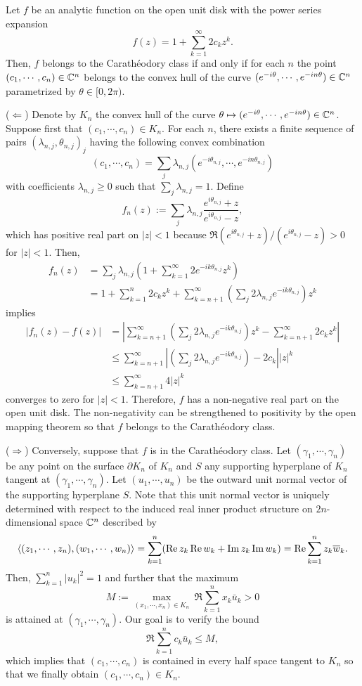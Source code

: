 \documentclass[a4paper]{article}
\begin{document}
\begin{thm}
Let $f$ be an analytic function on the open unit disk with the power series expansion
\[f(z)=1+\sum_{k=1}^\infty2c_kz^k.\]
Then, $f$ belongs to the Carath\'eodory class if and only if for each $n$ the point $(c_1,\cdots,c_n)\in\mathbb{C}^n$ belongs to the convex hull of the curve $(e^{-i\theta},\cdots,e^{-in\theta})\in\mathbb{C}^n$ parametrized by $\theta\in[0,2\pi)$.
\end{thm}
\begin{pf}
($\Leftarrow$)
Denote by $K_n$ the convex hull of the curve $\theta\mapsto(e^{-i\theta},\cdots,e^{-in\theta})\in\mathbb{C}^n$.
Suppose first that $(c_1,\cdots,c_n)\in K_n$.
For each $n$, there exists a finite sequence of pairs $(\lambda_{n,j},\theta_{n,j})_j$ having the following convex combination
\[(c_1,\cdots,c_n)=\sum_j\lambda_{n,j}(e^{-i\theta_{n,j}},\cdots,e^{-in\theta_{n,j}})\]
with coefficients $\lambda_{n,j}\ge0$ such that $\sum_j\lambda_{n,j}=1$.
Define
\[f_n(z):=\sum_j\lambda_{n,j}\frac{e^{i\theta_{n,j}}+z}{e^{i\theta_{n,j}}-z},\]
which has positive real part on $|z|<1$ because $\Re(e^{i\theta_{n,j}}+z)/(e^{i\theta_{n,j}}-z)>0$ for $|z|<1$.
Then,
\begin{align*}
f_n(z)
&=\sum_j\lambda_{n,j}(1+\sum_{k=1}^\infty2e^{-ik\theta_{n,j}}z^k)\\
&=1+\sum_{k=1}^n2c_kz^k+\sum_{k=n+1}^\infty\left(\sum_j2\lambda_{n,j}e^{-ik\theta_{n,j}}\right)z^k
\end{align*}
implies
\begin{align*}
|f_n(z)-f(z)|
&=\left|\sum_{k=n+1}^\infty\left(\sum_j2\lambda_{n,j}e^{-ik\theta_{n,j}}\right)z^k-\sum_{k=n+1}^\infty2c_kz^k\right|\\
&\le\sum_{k=n+1}^\infty\left|\left(\sum_j2\lambda_{n,j}e^{-ik\theta_{n,j}}\right)-2c_k\right||z|^k\\
&\le\sum_{k=n+1}^\infty4|z|^k
\end{align*}
converges to zero for $|z|<1$.
Therefore, $f$ has a non-negative real part on the open unit disk.
The non-negativity can be strengthened to positivity by the open mapping theorem so that $f$ belongs to the Carath\'eodory class.

($\Rightarrow$)
Conversely, suppose that $f$ is in the Carath\'eodory class.
Let $(\gamma_1,\cdots,\gamma_n)$ be any point on the surface $\partial K_n$ of $K_n$ and $S$ any supporting hyperplane of $K_n$ tangent at $(\gamma_1,\cdots,\gamma_n)$.
Let $(u_1,\cdots,u_n)$ be the outward unit normal vector of the supporting hyperplane $S$.
Note that this unit normal vector is uniquely determined with respect to the induced real inner product structure on $2n$-dimensional space $\mathbb{C}^n$ described by
\[\langle(z_1,\cdots,z_n),(w_1,\cdots,w_n)\rangle=\sum_{k=1}^n(\operatorname{Re} z_k\operatorname{Re} w_k+\operatorname{Im} z_k\operatorname{Im} w_k)=\operatorname{Re}\sum_{k=1}^nz_k\overline w_k.\]
Then, $\sum_{k=1}^n|u_k|^2=1$ and further that the maximum
\[M:=\max_{(x_1,\cdots,x_n)\in K_n}\ \Re\sum_{k=1}^nx_k\bar u_k>0\]
is attained at $(\gamma_1,\cdots,\gamma_n)$.
Our goal is to verify the bound
\[\Re\sum_{k=1}^nc_k\bar u_k\le M,\]
which implies that $(c_1,\cdots,c_n)$ is contained in every half space tangent to $K_n$ so that we finally obtain $(c_1,\cdots,c_n)\in K_n$.


\end{pf}
\end{document}
